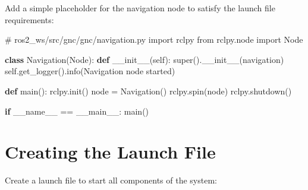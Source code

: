\documentclass[
  letterpaper,
  DIV=11,
  numbers=noendperiod]{scrreprt}
\newenvironment{Shaded}{\begin{snugshade}}{\end{snugshade}}
\newcommand{\BuiltInTok}[1]{\textcolor[rgb]{0.00,0.23,0.31}{#1}}
\newcommand{\CommentTok}[1]{\textcolor[rgb]{0.37,0.37,0.37}{#1}}
\newcommand{\ControlFlowTok}[1]{\textcolor[rgb]{0.00,0.23,0.31}{\textbf{#1}}}
\newcommand{\FunctionTok}[1]{\textcolor[rgb]{0.28,0.35,0.67}{#1}}
\newcommand{\ImportTok}[1]{\textcolor[rgb]{0.00,0.46,0.62}{#1}}
\newcommand{\KeywordTok}[1]{\textcolor[rgb]{0.00,0.23,0.31}{\textbf{#1}}}
\newcommand{\NormalTok}[1]{\textcolor[rgb]{0.00,0.23,0.31}{#1}}
\newcommand{\OperatorTok}[1]{\textcolor[rgb]{0.37,0.37,0.37}{#1}}
\newcommand{\StringTok}[1]{\textcolor[rgb]{0.13,0.47,0.30}{#1}}
\newcommand{\VariableTok}[1]{\textcolor[rgb]{0.07,0.07,0.07}{#1}}
\begin{document}
Add a simple placeholder for the navigation node to satisfy the launch
file requirements:

\begin{Shaded}
\begin{Highlighting}[]
\CommentTok{\# ros2\_ws/src/gnc/gnc/navigation.py}
\ImportTok{import}\NormalTok{ rclpy}
\ImportTok{from}\NormalTok{ rclpy.node }\ImportTok{import}\NormalTok{ Node}

\KeywordTok{class}\NormalTok{ Navigation(Node):}
    \KeywordTok{def} \FunctionTok{\_\_init\_\_}\NormalTok{(}\VariableTok{self}\NormalTok{):}
        \BuiltInTok{super}\NormalTok{().}\FunctionTok{\_\_init\_\_}\NormalTok{(}\StringTok{\textquotesingle{}navigation\textquotesingle{}}\NormalTok{)}
        \VariableTok{self}\NormalTok{.get\_logger().info(}\StringTok{\textquotesingle{}Navigation node started\textquotesingle{}}\NormalTok{)}

\KeywordTok{def}\NormalTok{ main():}
\NormalTok{    rclpy.init()}
\NormalTok{    node }\OperatorTok{=}\NormalTok{ Navigation()}
\NormalTok{    rclpy.spin(node)}
\NormalTok{    rclpy.shutdown()}

\ControlFlowTok{if} \VariableTok{\_\_name\_\_} \OperatorTok{==} \StringTok{\textquotesingle{}\_\_main\_\_\textquotesingle{}}\NormalTok{:}
\NormalTok{    main()}
\end{Highlighting}
\end{Shaded}

\section*{Creating the Launch File}\label{creating-the-launch-file}


Create a launch file to start all components of the system:
\end{document}
